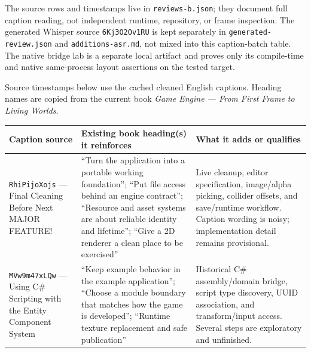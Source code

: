 The source rows and timestamps live in \texttt{reviews-b.json}; they document full caption reading, not independent runtime, repository, or frame inspection. The generated Whisper source \texttt{6Kj3O2Ov1RU} is kept separately in \texttt{generated-review.json} and \texttt{additions-asr.md}, not mixed into this caption-batch table. The native bridge lab is a separate local artifact and proves only its compile-time and native same-process layout assertions on the tested target.

Source timestamps below use the cached cleaned English captions. Heading names are copied from the current book \emph{Game Engine --- From First Frame to Living Worlds}.

{\def\LTcaptype{none} %
\begin{longtable}[]{@{}
  >{\raggedright\arraybackslash}p{}
  >{\raggedright\arraybackslash}p{}
  >{\raggedright\arraybackslash}p{}@{}}
\toprule\noalign{}
\begin{minipage}[b]{\linewidth}\raggedright
Caption source
\end{minipage} & \begin{minipage}[b]{\linewidth}\raggedright
Existing book heading(s) it reinforces
\end{minipage} & \begin{minipage}[b]{\linewidth}\raggedright
What it adds or qualifies
\end{minipage} \\
\midrule\noalign{}
\endhead
\bottomrule\noalign{}
\endlastfoot
\texttt{RhiPijoXojs} --- Final Cleaning Before Next MAJOR FEATURE! & ``Turn the application into a portable working foundation''; ``Put file access behind an engine contract''; ``Resource and asset systems are about reliable identity and lifetime''; ``Give a 2D renderer a clean place to be exercised'' & Live cleanup, editor specification, image/alpha picking, collider offsets, and save/runtime workflow. Caption wording is noisy; implementation detail remains provisional. \\
\texttt{MVw9m47xLQw} --- Using C\# Scripting with the Entity Component System & ``Keep example behavior in the example application''; ``Choose a module boundary that matches how the game is developed''; ``Runtime texture replacement and safe publication'' & Historical C\# assembly/domain bridge, script type discovery, UUID association, and transform/input access. Several steps are exploratory and unfinished. \\

\end{longtable}}
